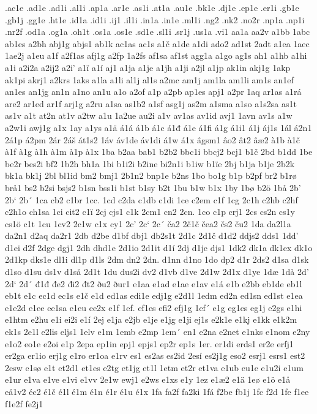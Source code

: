 .ac1e
.ad1e
.ad1i
.al1i
.ap1a
.ar1e
.as1i
.at1a
.au1e
.bk1e
.dj1e
.ep1e
.er1i
.gb1e
.gb1j
.gg1e
.ht1e
.id1a
.id1i
.ij1
.il1i
.in1a
.in1e
.ml1i
.ng2
.nk2
.no2r
.np1a
.np1i
.nr2f
.od1a
.og1a
.oh1t
.os1a
.os1e
.sd1e
.sl1i
.sr1j
.us1a
.vi1
aa1a
aa2v
a1bb
1abc
ab1es
a2bh
abj1g
abjs1
ab1k
ac1as
ac1s
a1č
a1de
a1di
ado2
ad1st
2adt
a1ea
1aec
1ae2j
a1eu
a1f
a2f1as
afj1g
a2fp
1a2fs
af1sa
af1st
agg1a
a1go
ag1s
ah1
a1hb
a1hi
a1i
a2i2a
a2ij2
a2i'
a1ï
a1í
aj1
a1ja
a1je
a1jh
a1ji
a2jl
a1jp
ak1in
akj1g
1akp
ak1pi
akrj1
a2krs
1aks
a1la
a1li
al1j
al1s
a2mc
am1j
am1la
am1li
am1s
an1ef
an1es
an1jg
an1n
a1no
an1u
a1o
a2of
a1p
a2pb
ap1es
apj1
a2pr
1aq
ar1as
a1rá
are2
ar1ed
ar1f
arj1g
a2ru
a1sa
as1b2
a1sf
asg1j
as2m
a1sma
a1so
a1s2sa
as1t
as1v
a1t
at2n
at1v
a2tw
a1u
1a2ue
au2i
a1v
av1as
av1id
avj1
1avn
av1s
a1w
a2w1i
awj1g
a1x
1ay
a1ys
a1ä
á1á
á1b
á1c
á1đ
á1e
á1fi
á1g
á1i1
á1j
áj1s
1ál
á2n1
2á1p
á2pm
2ár
2áš
át1s2
1áv
áv1de
áv1di
á1w
á1x
âgsm1
âo2
ât2
âæ2
à1b
à1č
à1f
à1g
à1h
à1m
à1p
à1x
1ba
b2aa
bab1
b2b2
bbc1i
bbcj2
bcj1
b1č
2bd
b1dd
1be
be2r
bes2i
bf2
1b2h
bh1a
1bi
b1i2i
b2ine
bi2n1i
b1iw
b1ïe
2bj
b1ja
b1je
2b2k
bk1a
bk1j
2bl
bl1id
bm2
bmj1
2b1n2
bnp1e
b2ns
1bo
bo1g
b1p
b2pf
br2
b1rø
brå1
bs2
b2si
bsjs2
b1sn
bss1i
b1st
b1sy
b2t
1bu
b1w
b1x
1by
1bø
b2ö
1bå
2b'
2b`
2b´
1ca
cb2
c1br
1cc.
1cd
c2da
c1db
c1di
1ce
c2em
c1f
1cg
2c1h
c2hb
c2hf
c2h1o
ch1sa
1ci
cit2
c1ï
2cj
cjs1
c1k
2cm1
cn2
2cn.
1co
c1p
crj1
2cs
cs2n
cs1y
cs1ö
c1t
1cu
1cv2
2c1w
c1x
cy1
2c'
2c`
2c´
ča2
2č1č
čea2
čs2
ču2
1da
da2l1a
da2n1
d2aq
da2r1
2db
d2be
d1bf
dbj1
db2s1t
2d1c
2d1č
d1d2
ddjs2
dds1
1dd'
d1ei
d2f
2dge
dgj1
2dh
dhd1e
2d1io
2d1it
d1í
2dj
d1je
djs1
1dk2
dk1a
dk1ex
dk1o
2d1kp
dks1e
dl1i
dl1p
d1ls
2dm
dn2
2dn.
d1nn
d1no
1do
dp2
d1r
2ds2
d1sa
d1sk
d1so
d1su
ds1v
d1så
2d1t
1du
dus2i
dv2
d1vb
d1ve
2d1w
2d1x
d1ye
1dæ
1då
2d'
2d`
2d´
đ1đ
đe2
đi2
đt2
ðu2
ður1
e1aa
e1ad
e1ae
e1av
e1á
e1b
e2bb
eb1de
eb1l
eb1t
e1c
ec1d
ec1s
e1č
e1d
ed1as
edi1e
edj1g
e2d1l
1edm
ed2n
ed1sn
ed1st
e1ea
e1e2d
e1ee
ee1sa
e1eu
ee2x
e1f
1ef.
ef1es
efi2
efj1g
1ef´
e1g
eg1es
eg1j
e2gs
e1hi
e1htm
e2hu
e1i
ei2i
e1í
2ej
e1ja
e2jb
e1je
e1jg
e1ji
ej1s
e2k1e
e1kj
e1kk
e1k2m
ek1s
2e1l
e2lis
eljs1
1elv
e1m
1emb
e2mp
1em´
en1
e2na
e2net
e1nks
e1nom
e2ny
e1o2
eo1e
e2oi
e1p
2epa
ep1in
epj1
epjs1
ep2r
ep1s
1er.
er1di
erds1
er2e
erfj1
er2ga
er1io
erj1g
e1ro
er1oa
e1rv
es1
es2as
es2id
2esí
es2j1g
eso2
esrj1
esrs1
est2
2esw
e1sø
e1t
et2d1
et1es
e2tg
et1jg
et1l
1etm
et2r
et1va
e1ub
eu1e
e1u2i
e1um
e1ur
e1va
e1ve
e1vi
e1vv
2e1w
ewj1
e2ws
e1xs
e1y
1ez
e1æ2
e1ä
1eø
e1ö
e1å
eå1v2
éc2
é1č
é1l
é1m
é1n
é1r
é1u
é1x
1fa
fa2f
fa2ki
1fá
f2be
fb1j
1fc
f2d
1fe
f1ee
f1e2f
fe2j1

